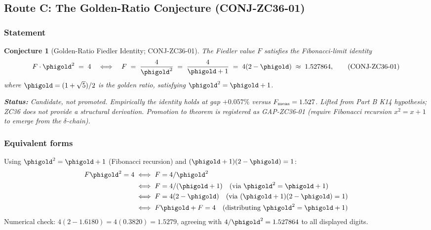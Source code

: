 \documentclass[12pt, a4paper]{article}
\newtheorem{conjecture}{Conjecture}[section]
\begin{document}
\subsection{Route C: The Golden-Ratio Conjecture (CONJ-ZC36-01)}
\label{sec:route-c}

\subsubsection{Statement}

\begin{conjecture}[Golden-Ratio Fiedler Identity;
                   CONJ-ZC36-01]
\label{conj:zc36-01}
The Fiedler value $F$ satisfies the Fibonacci-limit identity
\begin{equation}
  F \cdot \phigold^2 \;=\; 4
  \quad\Longleftrightarrow\quad
  F \;=\; \frac{4}{\phigold^2}
  \;=\; \frac{4}{\phigold + 1}
  \;=\; 4(2 - \phigold)
  \;\approx\; 1.527864,
  \tag{CONJ-ZC36-01}\label{eq:conj-zc36-01}
\end{equation}
where $\phigold = (1+\sqrt{5})/2$ is the golden ratio,
satisfying $\phigold^2 = \phigold + 1$.

\textbf{Status:} \emph{Candidate, not promoted.}
Empirically the identity holds at gap $+0.057\%$ versus
$F_{\rm meas} = 1.527$. Lifted from Part B K14 hypothesis;
ZC36 does not provide a structural derivation. Promotion to
theorem is registered as GAP-ZC36-01 (require Fibonacci
recursion $x^2 = x + 1$ to emerge from the $\delta$-chain).
\end{conjecture}

\subsubsection{Equivalent forms}

\begin{derivedbox}[title={Algebraic equivalences of CONJ-ZC36-01}]
Using $\phigold^2 = \phigold + 1$ (Fibonacci recursion) and
$(\phigold + 1)(2 - \phigold) = 1$:
\begin{align*}
  F\phigold^2 = 4
  &\;\Longleftrightarrow\;
  F = 4/\phigold^2 \\
  &\;\Longleftrightarrow\;
  F = 4/(\phigold + 1)
  \quad\text{(via $\phigold^2 = \phigold + 1$)}\\
  &\;\Longleftrightarrow\;
  F = 4(2 - \phigold)
  \quad\text{(via $(\phigold + 1)(2 - \phigold) = 1$)}\\
  &\;\Longleftrightarrow\;
  F\phigold + F = 4
  \quad\text{(distributing $\phigold^2 = \phigold + 1$)}
\end{align*}
Numerical check: $4(2 - 1.6180) = 4(0.3820) = 1.5279$, agreeing
with $4/\phigold^2 = 1.527864$ to all displayed digits.
\end{derivedbox}
\end{document}
